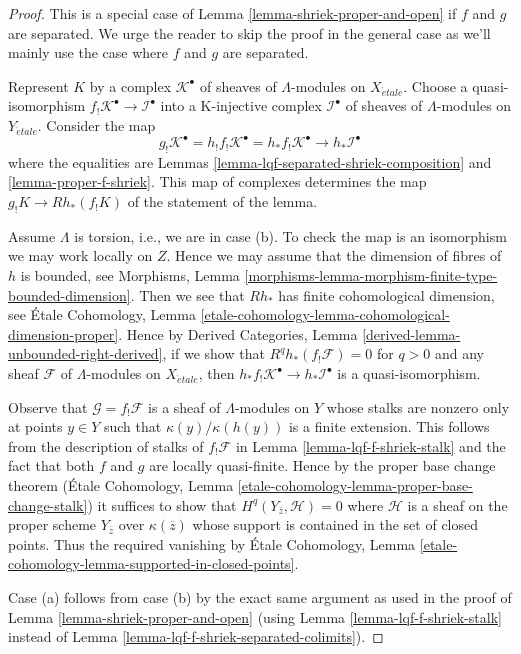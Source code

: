 \documentclass{stacks-project}
\theoremstyle{plain}
\theoremstyle{definition}
\theoremstyle{remark}
\numberwithin{equation}{subsection}
\def\etale{{\acute{e}tale}}
\begin{document}
\begin{proof}
This is a special case of Lemma \ref{lemma-shriek-proper-and-open}
if $f$ and $g$ are separated. We urge the reader to skip the proof
in the general case
as we'll mainly use the case where $f$ and $g$ are separated.

\medskip\noindent
Represent $K$ by a complex $\mathcal{K}^\bullet$ of sheaves of
$\Lambda$-modules on $X_\etale$. Choose a quasi-isomorphism
$f_!\mathcal{K}^\bullet \to \mathcal{I}^\bullet$ into a K-injective
complex $\mathcal{I}^\bullet$ of sheaves of $\Lambda$-modules on $Y_\etale$.
Consider the map
$$
g_!\mathcal{K}^\bullet =
h_!f_!\mathcal{K}^\bullet =
h_*f_!\mathcal{K}^\bullet
\longrightarrow
h_*\mathcal{I}^\bullet
$$
where the equalities are
Lemmas \ref{lemma-lqf-separated-shriek-composition}
and \ref{lemma-proper-f-shriek}. This map of complexes determines the map
$g_!K \to Rh_*(f_!K)$ of the statement of the lemma.

\medskip\noindent
Assume $\Lambda$ is torsion, i.e., we are in case (b). To check the map
is an isomorphism we may work locally on $Z$.
Hence we may assume that the dimension of fibres of $h$ is bounded,
see Morphisms, Lemma
\ref{morphisms-lemma-morphism-finite-type-bounded-dimension}.
Then we see that $Rh_*$ has finite cohomological dimension, see
\'Etale Cohomology, Lemma
\ref{etale-cohomology-lemma-cohomological-dimension-proper}.
Hence by Derived Categories, Lemma \ref{derived-lemma-unbounded-right-derived},
if we show that $R^qh_*(f_!\mathcal{F}) = 0$ for $q > 0$
and any sheaf $\mathcal{F}$ of $\Lambda$-modules on $X_\etale$, then
$h_*f_!\mathcal{K}^\bullet \to h_*\mathcal{I}^\bullet$ is a quasi-isomorphism.

\medskip\noindent
Observe that $\mathcal{G} = f_!\mathcal{F}$ is a sheaf of $\Lambda$-modules
on $Y$ whose stalks are nonzero only at points $y \in Y$ such that
$\kappa(y)/\kappa(h(y))$ is a finite extension. This follows from the
description of stalks of $f_!\mathcal{F}$ in
Lemma \ref{lemma-lqf-f-shriek-stalk}
and the fact that both $f$ and $g$ are locally quasi-finite.
Hence by the proper base change theorem (\'Etale Cohomology, Lemma
\ref{etale-cohomology-lemma-proper-base-change-stalk})
it suffices to show that $H^q(Y_{\overline{z}}, \mathcal{H}) = 0$
where $\mathcal{H}$ is a sheaf on the proper scheme $Y_{\overline{z}}$
over $\kappa(\overline{z})$ whose support is contained in the set
of closed points. Thus the required vanishing by \'Etale Cohomology, Lemma
\ref{etale-cohomology-lemma-supported-in-closed-points}.

\medskip\noindent
Case (a) follows from case (b) by the exact same argument as used
in the proof of Lemma \ref{lemma-shriek-proper-and-open}
(using Lemma \ref{lemma-lqf-f-shriek-stalk} instead of
Lemma \ref{lemma-lqf-f-shriek-separated-colimits}).
\end{proof}
\end{document}
